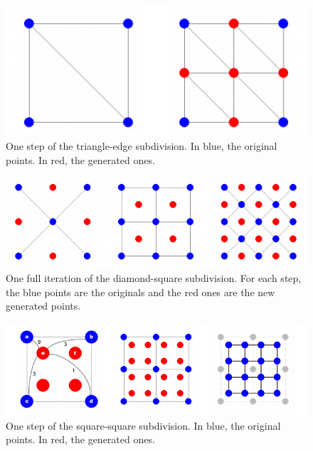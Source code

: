 \documentclass{acmtog}
\begin{document}
\begin{figure}
	\begin{center}
		\includegraphics[width=\columnwidth]{images/algorithm/triangleedge.png}
	\end{center}
	\caption{One step of the triangle-edge subdivision. In blue, the original points. In red, the generated ones.}
	\label{fig:algorithm:tes}
\end{figure}

\begin{figure}
	\begin{center}
		\includegraphics[width=\columnwidth]{images/algorithm/diamondsquare.png}
	\end{center}
	\caption{One full iteration of the diamond-square subdivision. For each step, the blue points are the originals and the red ones are the new generated points.}
	\label{fig:algorithm:dss}
\end{figure}

\begin{figure}
	\begin{center}
		\includegraphics[width=\columnwidth]{images/algorithm/squaresquare.png}
	\end{center}
	\caption{One step of the square-square subdivision. In blue, the original points. In red, the generated ones.}
	\label{fig:algorithm:sss}
\end{figure}
\end{document}
